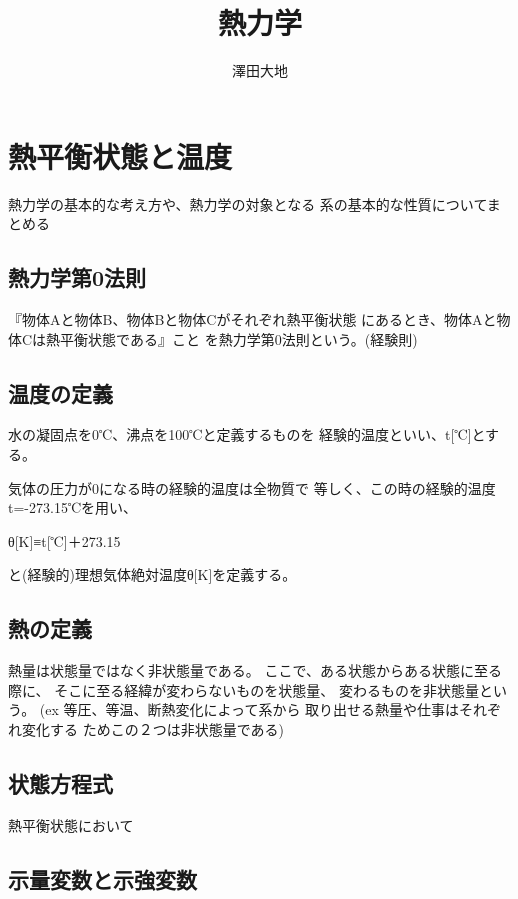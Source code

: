 \documentclass[11pt,a4paper]{jsarticle}
\begin{document}
\title{\Huge 熱力学}
\author{澤田大地}
\maketitle

\tableofcontents
\newpage

\section{熱平衡状態と温度}
熱力学の基本的な考え方や、熱力学の対象となる
系の基本的な性質についてまとめる

 \subsection{熱力学第0法則}
 『物体Aと物体B、物体Bと物体Cがそれぞれ熱平衡状態
 にあるとき、物体Aと物体Cは熱平衡状態である』こと
 を熱力学第0法則という。(経験則)
 \subsection{温度の定義}
 水の凝固点を0℃、沸点を100℃と定義するものを
 経験的温度といい、t[℃]とする。

 気体の圧力が0になる時の経験的温度は全物質で
 等しく、この時の経験的温度t=-273.15℃を用い、

 θ[K]≡t[℃]＋273.15

 と(経験的)理想気体絶対温度θ[K]を定義する。
 \subsection{熱の定義}
 熱量は状態量ではなく非状態量である。
 ここで、ある状態からある状態に至る際に、
 そこに至る経緯が変わらないものを状態量、
 変わるものを非状態量という。
 (ex 等圧、等温、断熱変化によって系から
 取り出せる熱量や仕事はそれぞれ変化する
 ためこの２つは非状態量である)
\subsection{状態方程式}
熱平衡状態において

\subsection{示量変数と示強変数}
\end{document}
